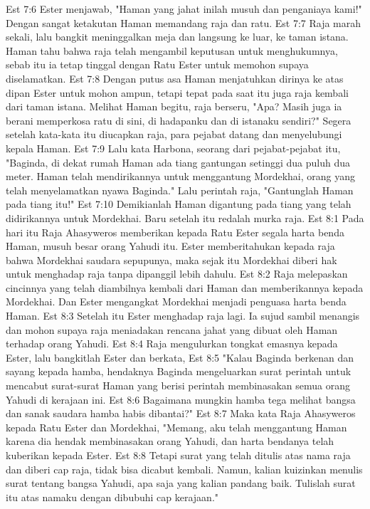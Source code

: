 Est 7:6  Ester menjawab, "Haman yang jahat inilah musuh dan penganiaya kami!" Dengan sangat ketakutan Haman memandang raja dan ratu.
Est 7:7  Raja marah sekali, lalu bangkit meninggalkan meja dan langsung ke luar, ke taman istana. Haman tahu bahwa raja telah mengambil keputusan untuk menghukumnya, sebab itu ia tetap tinggal dengan Ratu Ester untuk memohon supaya diselamatkan.
Est 7:8  Dengan putus asa Haman menjatuhkan dirinya ke atas dipan Ester untuk mohon ampun, tetapi tepat pada saat itu juga raja kembali dari taman istana. Melihat Haman begitu, raja berseru, "Apa? Masih juga ia berani memperkosa ratu di sini, di hadapanku dan di istanaku sendiri?" Segera setelah kata-kata itu diucapkan raja, para pejabat datang dan menyelubungi kepala Haman.
Est 7:9  Lalu kata Harbona, seorang dari pejabat-pejabat itu, "Baginda, di dekat rumah Haman ada tiang gantungan setinggi dua puluh dua meter. Haman telah mendirikannya untuk menggantung Mordekhai, orang yang telah menyelamatkan nyawa Baginda." Lalu perintah raja, "Gantunglah Haman pada tiang itu!"
Est 7:10  Demikianlah Haman digantung pada tiang yang telah didirikannya untuk Mordekhai. Baru setelah itu redalah murka raja.
Est 8:1  Pada hari itu Raja Ahasyweros memberikan kepada Ratu Ester segala harta benda Haman, musuh besar orang Yahudi itu. Ester memberitahukan kepada raja bahwa Mordekhai saudara sepupunya, maka sejak itu Mordekhai diberi hak untuk menghadap raja tanpa dipanggil lebih dahulu.
Est 8:2  Raja melepaskan cincinnya yang telah diambilnya kembali dari Haman dan memberikannya kepada Mordekhai. Dan Ester mengangkat Mordekhai menjadi penguasa harta benda Haman.
Est 8:3  Setelah itu Ester menghadap raja lagi. Ia sujud sambil menangis dan mohon supaya raja meniadakan rencana jahat yang dibuat oleh Haman terhadap orang Yahudi.
Est 8:4  Raja mengulurkan tongkat emasnya kepada Ester, lalu bangkitlah Ester dan berkata,
Est 8:5  "Kalau Baginda berkenan dan sayang kepada hamba, hendaknya Baginda mengeluarkan surat perintah untuk mencabut surat-surat Haman yang berisi perintah membinasakan semua orang Yahudi di kerajaan ini.
Est 8:6  Bagaimana mungkin hamba tega melihat bangsa dan sanak saudara hamba habis dibantai?"
Est 8:7  Maka kata Raja Ahasyweros kepada Ratu Ester dan Mordekhai, "Memang, aku telah menggantung Haman karena dia hendak membinasakan orang Yahudi, dan harta bendanya telah kuberikan kepada Ester.
Est 8:8  Tetapi surat yang telah ditulis atas nama raja dan diberi cap raja, tidak bisa dicabut kembali. Namun, kalian kuizinkan menulis surat tentang bangsa Yahudi, apa saja yang kalian pandang baik. Tulislah surat itu atas namaku dengan dibubuhi cap kerajaan."
